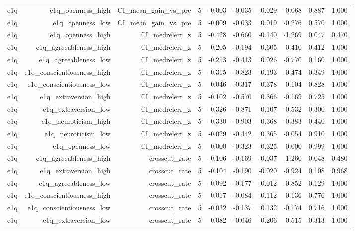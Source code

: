\documentclass[11pt]{article}
\begin{document}
\begin{landscape}
\begin{longtable}{@{}lrrrrrrrrr@{}}
e1q & e1q\_openness\_high & CI\_mean\_gain\_vs\_pre & 5 & -0.003 & -0.035 & 0.029 & -0.068 & 0.887 & 1.000 \\
e1q & e1q\_openness\_low & CI\_mean\_gain\_vs\_pre & 5 & -0.009 & -0.033 & 0.019 & -0.276 & 0.570 & 1.000 \\
e1q & e1q\_openness\_high & CI\_medrelerr\_z & 5 & -0.428 & -0.660 & -0.140 & -1.269 & 0.047 & 0.470 \\
e1q & e1q\_agreeableness\_high & CI\_medrelerr\_z & 5 & 0.205 & -0.194 & 0.605 & 0.410 & 0.412 & 1.000 \\
e1q & e1q\_agreeableness\_low & CI\_medrelerr\_z & 5 & -0.213 & -0.413 & 0.026 & -0.770 & 0.160 & 1.000 \\
e1q & e1q\_conscientiousness\_high & CI\_medrelerr\_z & 5 & -0.315 & -0.823 & 0.193 & -0.474 & 0.349 & 1.000 \\
e1q & e1q\_conscientiousness\_low & CI\_medrelerr\_z & 5 & 0.046 & -0.317 & 0.378 & 0.104 & 0.828 & 1.000 \\
e1q & e1q\_extraversion\_high & CI\_medrelerr\_z & 5 & -0.102 & -0.570 & 0.366 & -0.169 & 0.725 & 1.000 \\
e1q & e1q\_extraversion\_low & CI\_medrelerr\_z & 5 & -0.326 & -0.871 & 0.107 & -0.532 & 0.300 & 1.000 \\
e1q & e1q\_neuroticism\_high & CI\_medrelerr\_z & 5 & -0.330 & -0.903 & 0.368 & -0.383 & 0.440 & 1.000 \\
e1q & e1q\_neuroticism\_low & CI\_medrelerr\_z & 5 & -0.029 & -0.442 & 0.365 & -0.054 & 0.910 & 1.000 \\
e1q & e1q\_openness\_low & CI\_medrelerr\_z & 5 & 0.000 & -0.323 & 0.325 & 0.000 & 0.999 & 1.000 \\
e1q & e1q\_agreeableness\_high & crosscut\_rate & 5 & -0.106 & -0.169 & -0.037 & -1.260 & 0.048 & 0.480 \\
e1q & e1q\_extraversion\_high & crosscut\_rate & 5 & -0.104 & -0.190 & -0.020 & -0.924 & 0.108 & 0.968 \\
e1q & e1q\_agreeableness\_low & crosscut\_rate & 5 & -0.092 & -0.177 & -0.012 & -0.852 & 0.129 & 1.000 \\
e1q & e1q\_conscientiousness\_high & crosscut\_rate & 5 & 0.017 & -0.084 & 0.112 & 0.136 & 0.776 & 1.000 \\
e1q & e1q\_conscientiousness\_low & crosscut\_rate & 5 & -0.032 & -0.137 & 0.132 & -0.174 & 0.716 & 1.000 \\
e1q & e1q\_extraversion\_low & crosscut\_rate & 5 & 0.082 & -0.046 & 0.206 & 0.515 & 0.313 & 1.000 \\

\end{longtable}
\end{landscape}
\end{document}
